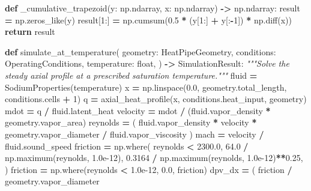 \documentclass[
  12pt,a4paper,oneside]{report}
\newenvironment{Shaded}{\begin{snugshade}}{\end{snugshade}}
\newcommand{\BuiltInTok}[1]{#1}
\newcommand{\CommentTok}[1]{\textcolor[rgb]{0.56,0.35,0.01}{\textit{#1}}}
\newcommand{\ControlFlowTok}[1]{\textcolor[rgb]{0.13,0.29,0.53}{\textbf{#1}}}
\newcommand{\DecValTok}[1]{\textcolor[rgb]{0.00,0.00,0.81}{#1}}
\newcommand{\FloatTok}[1]{\textcolor[rgb]{0.00,0.00,0.81}{#1}}
\newcommand{\KeywordTok}[1]{\textcolor[rgb]{0.13,0.29,0.53}{\textbf{#1}}}
\newcommand{\NormalTok}[1]{#1}
\newcommand{\OperatorTok}[1]{\textcolor[rgb]{0.81,0.36,0.00}{\textbf{#1}}}
\begin{document}
\begin{Shaded}
\begin{Highlighting}[]
\KeywordTok{def}\NormalTok{ \_cumulative\_trapezoid(y: np.ndarray, x: np.ndarray) }\OperatorTok{{-}\textgreater{}}\NormalTok{ np.ndarray:}
\NormalTok{    result }\OperatorTok{=}\NormalTok{ np.zeros\_like(y)}
\NormalTok{    result[}\DecValTok{1}\NormalTok{:] }\OperatorTok{=}\NormalTok{ np.cumsum(}\FloatTok{0.5} \OperatorTok{*}\NormalTok{ (y[}\DecValTok{1}\NormalTok{:] }\OperatorTok{+}\NormalTok{ y[:}\OperatorTok{{-}}\DecValTok{1}\NormalTok{]) }\OperatorTok{*}\NormalTok{ np.diff(x))}
    \ControlFlowTok{return}\NormalTok{ result}


\KeywordTok{def}\NormalTok{ simulate\_at\_temperature(}
\NormalTok{    geometry: HeatPipeGeometry,}
\NormalTok{    conditions: OperatingConditions,}
\NormalTok{    temperature: }\BuiltInTok{float}\NormalTok{,}
\NormalTok{) }\OperatorTok{{-}\textgreater{}}\NormalTok{ SimulationResult:}
    \CommentTok{"""Solve the steady axial profile at a prescribed saturation temperature."""}
\NormalTok{    fluid }\OperatorTok{=}\NormalTok{ SodiumProperties(temperature)}
\NormalTok{    x }\OperatorTok{=}\NormalTok{ np.linspace(}\FloatTok{0.0}\NormalTok{, geometry.total\_length, conditions.cells }\OperatorTok{+} \DecValTok{1}\NormalTok{)}
\NormalTok{    q }\OperatorTok{=}\NormalTok{ axial\_heat\_profile(x, conditions.heat\_input, geometry)}
\NormalTok{    mdot }\OperatorTok{=}\NormalTok{ q }\OperatorTok{/}\NormalTok{ fluid.latent\_heat}
\NormalTok{    velocity }\OperatorTok{=}\NormalTok{ mdot }\OperatorTok{/}\NormalTok{ (fluid.vapor\_density }\OperatorTok{*}\NormalTok{ geometry.vapor\_area)}
\NormalTok{    reynolds }\OperatorTok{=}\NormalTok{ (}
\NormalTok{        fluid.vapor\_density }\OperatorTok{*}\NormalTok{ velocity }\OperatorTok{*}\NormalTok{ geometry.vapor\_diameter}
        \OperatorTok{/}\NormalTok{ fluid.vapor\_viscosity}
\NormalTok{    )}
\NormalTok{    mach }\OperatorTok{=}\NormalTok{ velocity }\OperatorTok{/}\NormalTok{ fluid.sound\_speed}
\NormalTok{    friction }\OperatorTok{=}\NormalTok{ np.where(}
\NormalTok{        reynolds }\OperatorTok{\textless{}} \FloatTok{2300.0}\NormalTok{,}
        \FloatTok{64.0} \OperatorTok{/}\NormalTok{ np.maximum(reynolds, }\FloatTok{1.0e{-}12}\NormalTok{),}
        \FloatTok{0.3164} \OperatorTok{/}\NormalTok{ np.maximum(reynolds, }\FloatTok{1.0e{-}12}\NormalTok{)}\OperatorTok{**}\FloatTok{0.25}\NormalTok{,}
\NormalTok{    )}
\NormalTok{    friction }\OperatorTok{=}\NormalTok{ np.where(reynolds }\OperatorTok{\textless{}} \FloatTok{1.0e{-}12}\NormalTok{, }\FloatTok{0.0}\NormalTok{, friction)}
\NormalTok{    dpv\_dx }\OperatorTok{=}\NormalTok{ (}
\NormalTok{        friction }\OperatorTok{/}\NormalTok{ geometry.vapor\_diameter}

\end{Highlighting}
\end{Shaded}
\end{document}
